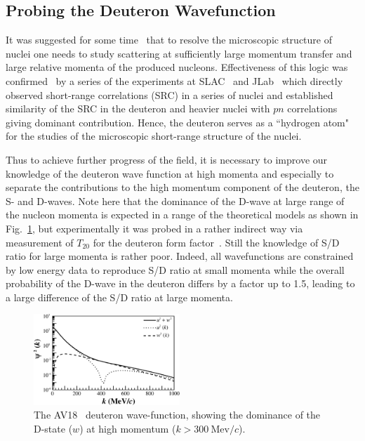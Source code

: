 \subsection{Probing the Deuteron Wavefunction}

It was suggested for some time~\cite{Frankfurt:1981mk} that to resolve the microscopic structure of nuclei one needs to study scattering at sufficiently large momentum transfer and large relative momenta of the produced nucleons. Effectiveness of this logic was confirmed~\cite{Arrington:2011xs} by a series of the experiments at SLAC~\cite{Frankfurt:1993sp} and JLab~\cite{Arrington:1998ps,Fomin:2011ng} which directly observed short-range correlations (SRC) in a series of nuclei and established similarity of the SRC in the deuteron and heavier nuclei with $pn$ correlations giving dominant contribution.  Hence, the deuteron serves as a ``hydrogen atom" for the studies of the microscopic short-range structure  of the nuclei.

Thus to achieve further progress of the field, it is necessary to improve our knowledge of the deuteron wave function at high momenta and especially to separate the contributions to the high momentum component of the deuteron, the S- and D-waves. Note here that the dominance of the D-wave at large range of the nucleon momenta is expected in a range of the theoretical models as shown in Fig.~\ref{sd-wf}, but experimentally it was probed in a rather indirect way via measurement of $T_{20}$ for the deuteron form factor~\cite{Garcon:2001sz}. Still the knowledge of S/D ratio for large momenta is rather poor. Indeed, all wavefunctions are constrained by low energy data to reproduce S/D ratio at small momenta while the overall probability of the D-wave in the deuteron differs by a factor up to 1.5, leading to a large difference of the S/D ratio at large momenta.

\begin{figure}
\begin{center}
\includegraphics[width=0.49\textwidth]{figs/sd_wf_av18.eps}
\caption{\label{sd-wf} The AV18~\cite{PhysRevC.84.034003} deuteron wave-function, showing the dominance of the D-state ($w$) at high momentum ($k>300\mathrm{~Mev}/c$).}
\end{center}
\end{figure}

